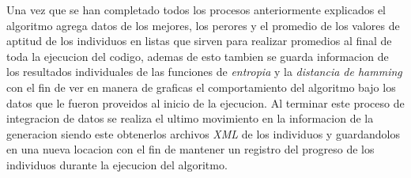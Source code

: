 Una vez que se han completado todos los procesos anteriormente explicados el
algoritmo agrega datos de los mejores, los perores y el promedio de los valores
de aptitud de los individuos en listas que sirven para realizar promedios al
final de toda la ejecucion del codigo, ademas de esto tambien se guarda
informacion de los resultados individuales de las funciones de \textit{entropia}
y la \textit{distancia de hamming} con el fin de ver en manera de graficas el
comportamiento del algoritmo bajo los datos que le fueron proveidos al inicio de
la ejecucion. Al terminar este proceso de integracion de datos se realiza el
ultimo movimiento en la informacion de la generacion siendo este obtenerlos
archivos \textit{XML} de los individuos y guardandolos en una nueva locacion con
el fin de mantener un registro del progreso de los individuos durante la
ejecucion del algoritmo.